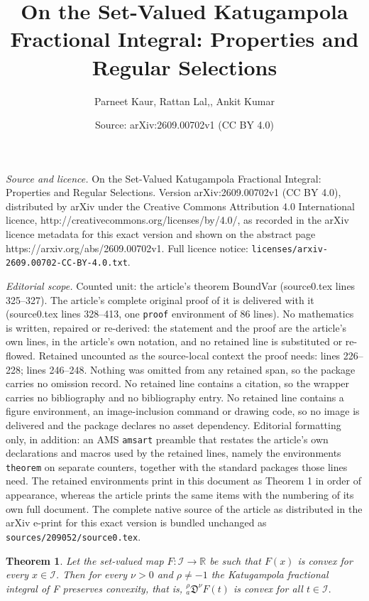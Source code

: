 \documentclass[10pt,a4paper]{amsart}
\title{On the Set-Valued Katugampola Fractional Integral: Properties and Regular Selections}
\author{Parneet Kaur, Rattan Lal,, Ankit Kumar}
\date{Source: arXiv:2609.00702v1 (CC BY 4.0)}
\newtheorem{theorem}{Theorem}
\begin{document}
\maketitle

\noindent\emph{Source and licence.} On the Set-Valued Katugampola Fractional Integral: Properties and Regular Selections. Version arXiv:2609.00702v1 (CC BY 4.0), distributed by arXiv under the Creative Commons Attribution 4.0 International licence, http://creativecommons.org/licenses/by/4.0/, as recorded in the arXiv licence metadata for this exact version and shown on the abstract page https://arxiv.org/abs/2609.00702v1. Full licence notice: \texttt{licenses/arxiv-2609.00702-CC-BY-4.0.txt}.\par\smallskip

\noindent\textit{Editorial scope.} Counted unit: the article's theorem BoundVar (source0.tex lines 325--327). The article's complete original proof of it is delivered with it (source0.tex lines 328--413, one \texttt{proof} environment of 86 lines). No mathematics is written, repaired or re-derived: the statement and the proof are the article's own lines, in the article's own notation, and no retained line is substituted or re-flowed.  Retained uncounted as the source-local context the proof needs: lines 226--228; lines 246--248.  Nothing was omitted from any retained span, so the package carries no omission record.  No retained line contains a citation, so the wrapper carries no bibliography and no bibliography entry.  No retained line contains a figure environment, an image-inclusion command or drawing code, so no image is delivered and the package declares no asset dependency.  Editorial formatting only, in addition: an AMS \texttt{amsart} preamble that restates the article's own declarations and macros used by the retained lines, namely the environments \texttt{theorem} on separate counters, together with the standard packages those lines need.  The retained environments print in this document as Theorem 1 in order of appearance, whereas the article prints the same items with the numbering of its own full document.  The complete native source of the article as distributed in the arXiv e-print for this exact version is bundled unchanged as \texttt{sources/209052/source0.tex}.
 \begin{theorem} \label{convex}
     Let the set-valued map $F:\mathcal{I}\to\mathbb{R}$ be such that $F(x)$ is convex for every $x\in \mathcal{I}$. Then for every $\nu > 0$ and $ \rho \neq -1 $ the Katugampola fractional integral of F preserves convexity, that is, $_a^\rho\mathfrak{D}^\nu F(t)$ is convex for all $t\in \mathcal{I}.$
 \end{theorem}
\end{document}
